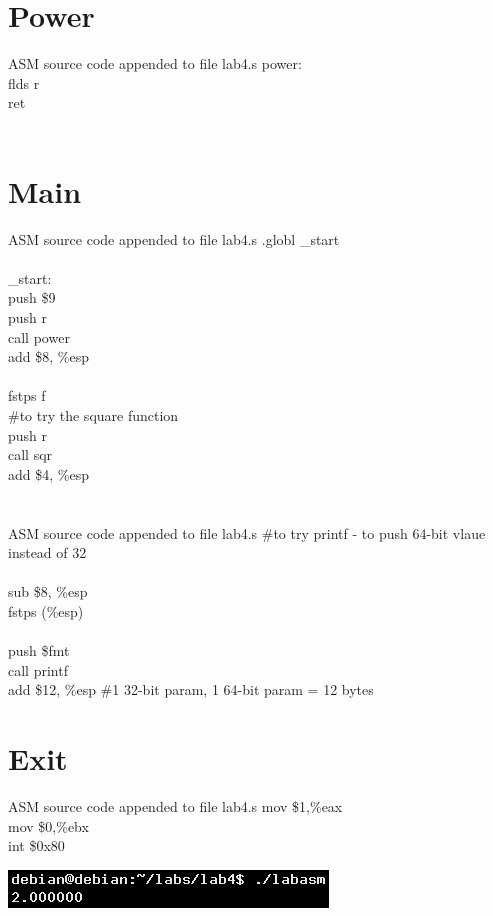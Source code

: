 \documentclass{article}
\begin{document}
\clearpage\section*{Power}
\begin{GFT}{ASM source code appended to file lab4.s}
\+power:\\
\+ flds r\\
\+ ret\\
\+\\
\end{GFT}
\clearpage\section*{Main}
\begin{GFT}{ASM source code appended to file lab4.s}
\+.globl \_start\\
\+\\
\+\_start:\\
\+	push \$9\\
\+	push r\\
\+	call power\\
\+	add \$8, \%esp\\
\+\\
\+	fstps f\\
\+\#to try the square function\\
\+	push r \\
\+	call sqr\\
\+	add \$4, \%esp\\
\end{GFT}
\clearpage\section*{}
\begin{GFT}{ASM source code appended to file lab4.s}
\+\#to try printf - to push 64-bit vlaue instead of 32\\
\+		\\
\+	sub \$8, \%esp\\
\+	fstps (\%esp)\\
\+\\
\+	push \$fmt\\
\+	call printf\\
\+	add \$12, \%esp \#1 32-bit param, 1 64-bit param = 12 bytes\\
\end{GFT}

\clearpage\section*{Exit}
\begin{GFT}{ASM source code appended to file lab4.s}
\+	mov \$1,\%eax\\
\+	mov \$0,\%ebx\\
\+	int \$0x80\\
\end{GFT}
\includegraphics[scale = 0.5]{labasm.png}
\clearpage
	
\end{document}
